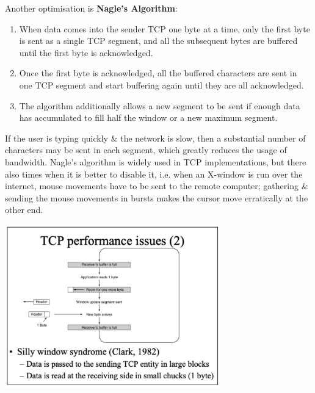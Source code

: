 \documentclass[11pt]{article}
\begin{document}
Another optimisation is \textbf{Nagle's Algorithm}: 
\begin{enumerate}
    \item   When data comes into the sender TCP one byte at a time, only the first byte is sent as a single TCP segment, and all the subsequent bytes are buffered until the first byte is acknowledged.
    \item   Once the first byte is acknowledged, all the buffered characters are sent in one TCP segment and start buffering again until they are all acknowledged.
    \item   The algorithm additionally allows a new segment to be sent if enough data has accumulated to fill half the window or a new maximum segment.
\end{enumerate}
If the user is typing quickly \& the network is slow, then a substantial number of characters may be sent in each segment, which greatly reduces the usage of bandwidth.
Nagle's algorithm is widely used in TCP implementations, but there also times when it is better to disable it, i.e. when an X-window is run over the internet, mouse movements have to be sent to the remote 
computer; gathering \& sending the mouse movements in bursts makes the cursor move erratically at the other end.

\begin{center}
    \includegraphics[width=0.7\textwidth]{tcpperfomanceissues2.png}
\end{center}
\end{document}
